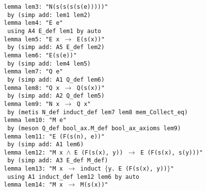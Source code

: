 \documentclass[11pt,a4paper]{article}
\theoremstyle{definition}
\begin{document}
\texttt{lemma lem3: "N(s(s(s(s(e)))))"}\\
 \hspace{3mm}  \texttt{ by (simp add: lem1 lem2)}\\
\texttt{lemma lem4: "E e"}\\
 \hspace{3mm}  \texttt{ using A4 E\_def lem1 by auto}\\
\texttt{lemma lem5: "E x $\longrightarrow$ E(s(x))"}\\
 \hspace{3mm}  \texttt{ by (simp add: A5 E\_def lem2)}\\
\texttt{lemma lem6: "E(s(e))"}\\
 \hspace{3mm}  \texttt{ by (simp add: lem4 lem5)}\\
\texttt{lemma lem7: "Q e"}\\
 \hspace{3mm}  \texttt{ by (simp add: A1 Q\_def lem6)}\\
\texttt{lemma lem8: "Q x $\longrightarrow$ Q(s(x))"}\\
 \hspace{3mm}  \texttt{ by (simp add: A2 Q\_def lem5)}\\
\texttt{lemma lem9: "N x $\longrightarrow$ Q x"}\\
 \hspace{3mm}  \texttt{ by (metis N\_def induct\_def lem7 lem8 mem\_Collect\_eq)}\\
\texttt{lemma lem10: "M e"}\\
 \hspace{3mm}  \texttt{ by (meson Q\_def bool\_ax.M\_def bool\_ax\_axioms lem9)}\\
\texttt{lemma lem11: "E (F(s(n), e))"}\\
 \hspace{3mm}  \texttt{ by (simp add: A1 lem6)}\\
\texttt{lemma lem12: "M x $\wedge$ E (F(s(x), y)) $\longrightarrow$ E (F(s(x), s(y)))"}\\
 \hspace{3mm}  \texttt{ by (simp add: A3 E\_def M\_def)}\\
\texttt{lemma lem13: "M x $\longrightarrow$ induct $\{$y. E (F(s(x), y))$\}$"}\\
 \hspace{3mm}  \texttt{ using A1 induct\_def lem12 lem6 by auto}\\
\texttt{lemma lem14: "M x $\longrightarrow$ M(s(x))"}\\
\end{document}

